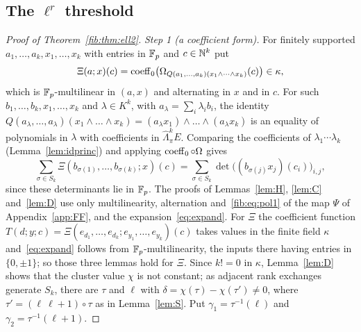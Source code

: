 \subsection{The \texorpdfstring{$\ell^r$}{l\textasciicircum r} threshold}\label{frc:ssec:threshold}
\begin{proof}[Proof of Theorem~\ref{fib:thm:ell2}]
\emph{Step 1 (a coefficient form).} For finitely supported $a_1,\dots,a_k,x_1,\dots,x_k$ with entries in $\mathbb F_p$ and
$c\in\mathbb N^k$ put
\[
 \Xi(a;x)(c)=\operatorname{coeff}_0\bigl(\Omega_{Q(a_1,\dots,a_k)(x_1\wedge\dots\wedge x_k)}(c)\bigr)\in\kappa,
\]
which is $\mathbb F_p$\nobreakdash-multilinear in $(a,x)$ and alternating in $x$ and in $c$. For such $b_1,\dots,b_k,x_1,\dots,x_k$
and $\lambda\in K^k$, with $a_\lambda=\sum_i\lambda_ib_i$, the identity
$Q(a_\lambda,\dots,a_\lambda)(x_1\wedge\dots\wedge x_k)=(a_\lambda x_1)\wedge\dots\wedge(a_\lambda x_k)$ is an equality of
polynomials in $\lambda$ with coefficients in $\widehat\Lambda^k_\pi E$. Comparing the coefficients of
$\lambda_1\cdots\lambda_k$ (Lemma~\ref{lem:idprinc}) and applying $\operatorname{coeff}_0\circ\Omega$ gives
\begin{equation}\label{fib:eq:pol1}
 \sum_{\sigma\in S_k}\Xi(b_{\sigma(1)},\dots,b_{\sigma(k)};x)(c)
 =\sum_{\sigma\in S_k}\det\bigl((b_{\sigma(j)}x_j)(c_i)\bigr)_{i,j},
\end{equation}
since these determinants lie in $\mathbb F_p$. The proofs of Lemmas~\ref{lem:H}, \ref{lem:C} and~\ref{lem:D} use only
multilinearity, alternation and~\eqref{fib:eq:pol1} of the map $\Psi$ of Appendix~\ref{app:FF}, and the
expansion~\eqref{eq:expand}. For $\Xi$ the coefficient function
$T(d;y;c)=\Xi(e_{d_1},\dots,e_{d_k};e_{y_1},\dots,e_{y_k})(c)$ takes values in the finite field $\kappa$
and~\eqref{eq:expand} follows from $\mathbb F_p$\nobreakdash-multilinearity, the inputs there having entries in $\{0,\pm1\}$; so
those three lemmas hold for $\Xi$. Since $k!=0$ in $\kappa$, Lemma~\ref{lem:D} shows that the cluster value $\chi$ is
not constant; as adjacent rank exchanges generate $S_k$, there are $\tau$ and $\ell$ with
$\delta=\chi(\tau)-\chi(\tau')\ne0$, where $\tau'=(\ell\ \ell{+}1)\circ\tau$ as in Lemma~\ref{lem:S}. Put
$\gamma_1=\tau^{-1}(\ell)$ and $\gamma_2=\tau^{-1}(\ell+1)$.


\end{proof}
